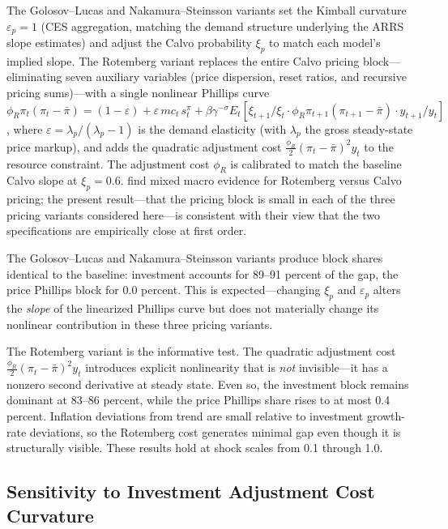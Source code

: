 \documentclass[12pt]{article}
\theoremstyle{plain}
\theoremstyle{definition}
\theoremstyle{remark}
\begin{document}
The Golosov--Lucas and Nakamura--Steinsson variants set the Kimball curvature $\varepsilon_p = 1$ (CES aggregation, matching the demand structure underlying the ARRS slope estimates) and adjust the Calvo probability $\xi_p$ to match each model's implied slope. The Rotemberg variant replaces the entire Calvo pricing block---eliminating seven auxiliary variables (price dispersion, reset ratios, and recursive pricing sums)---with a single nonlinear Phillips curve $\phi_R \pi_t (\pi_t - \bar{\pi}) = (1 - \varepsilon) + \varepsilon \, mc_t \, s_t^{\pi} + \beta \gamma^{-\sigma} E_t [\xi_{t+1}/\xi_t \cdot \phi_R \pi_{t+1} (\pi_{t+1} - \bar{\pi}) \cdot y_{t+1}/y_t]$, where $\varepsilon = \lambda_p / (\lambda_p - 1)$ is the demand elasticity (with $\lambda_p$ the gross steady-state price markup), and adds the quadratic adjustment cost $\frac{\phi_R}{2}(\pi_t - \bar{\pi})^2 y_t$ to the resource constraint. The adjustment cost $\phi_R$ is calibrated to match the baseline Calvo slope at $\xi_p = 0.6$. \citet{richter2016zlb} find mixed macro evidence for Rotemberg versus Calvo pricing; the present result---that the pricing block is small in each of the three pricing variants considered here---is consistent with their view that the two specifications are empirically close at first order.

The Golosov--Lucas and Nakamura--Steinsson variants produce block shares identical to the baseline: investment accounts for 89--91 percent of the gap, the price Phillips block for 0.0 percent. This is expected---changing $\xi_p$ and $\varepsilon_p$ alters the \emph{slope} of the linearized Phillips curve but does not materially change its nonlinear contribution in these three pricing variants.

The Rotemberg variant is the informative test. The quadratic adjustment cost $\frac{\phi_R}{2}(\pi_t - \bar{\pi})^2 y_t$ introduces explicit nonlinearity that is \emph{not} invisible---it has a nonzero second derivative at steady state. Even so, the investment block remains dominant at 83--86 percent, while the price Phillips share rises to at most 0.4 percent. Inflation deviations from trend are small relative to investment growth-rate deviations, so the Rotemberg cost generates minimal gap even though it is structurally visible. These results hold at shock scales from 0.1 through 1.0.

\subsection{Sensitivity to Investment Adjustment Cost Curvature}
\label{subsec:csadjcost_sensitivity}
\end{document}
